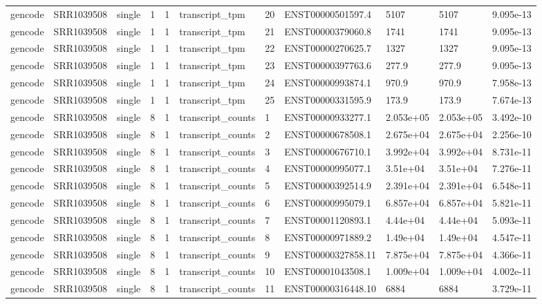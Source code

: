 \begin{tabular}{lllllllllll}
gencode & SRR1039508 & single & 1 & 1 & transcript\_tpm & 20 & ENST00000501597.4 & 5107 & 5107 & 9.095e-13 \\
gencode & SRR1039508 & single & 1 & 1 & transcript\_tpm & 21 & ENST00000379060.8 & 1741 & 1741 & 9.095e-13 \\
gencode & SRR1039508 & single & 1 & 1 & transcript\_tpm & 22 & ENST00000270625.7 & 1327 & 1327 & 9.095e-13 \\
gencode & SRR1039508 & single & 1 & 1 & transcript\_tpm & 23 & ENST00000397763.6 & 277.9 & 277.9 & 9.095e-13 \\
gencode & SRR1039508 & single & 1 & 1 & transcript\_tpm & 24 & ENST00000993874.1 & 970.9 & 970.9 & 7.958e-13 \\
gencode & SRR1039508 & single & 1 & 1 & transcript\_tpm & 25 & ENST00000331595.9 & 173.9 & 173.9 & 7.674e-13 \\
gencode & SRR1039508 & single & 8 & 1 & transcript\_counts & 1 & ENST00000933277.1 & 2.053e+05 & 2.053e+05 & 3.492e-10 \\
gencode & SRR1039508 & single & 8 & 1 & transcript\_counts & 2 & ENST00000678508.1 & 2.675e+04 & 2.675e+04 & 2.256e-10 \\
gencode & SRR1039508 & single & 8 & 1 & transcript\_counts & 3 & ENST00000676710.1 & 3.992e+04 & 3.992e+04 & 8.731e-11 \\
gencode & SRR1039508 & single & 8 & 1 & transcript\_counts & 4 & ENST00000995077.1 & 3.51e+04 & 3.51e+04 & 7.276e-11 \\
gencode & SRR1039508 & single & 8 & 1 & transcript\_counts & 5 & ENST00000392514.9 & 2.391e+04 & 2.391e+04 & 6.548e-11 \\
gencode & SRR1039508 & single & 8 & 1 & transcript\_counts & 6 & ENST00000995079.1 & 6.857e+04 & 6.857e+04 & 5.821e-11 \\
gencode & SRR1039508 & single & 8 & 1 & transcript\_counts & 7 & ENST00001120893.1 & 4.44e+04 & 4.44e+04 & 5.093e-11 \\
gencode & SRR1039508 & single & 8 & 1 & transcript\_counts & 8 & ENST00000971889.2 & 1.49e+04 & 1.49e+04 & 4.547e-11 \\
gencode & SRR1039508 & single & 8 & 1 & transcript\_counts & 9 & ENST00000327858.11 & 7.875e+04 & 7.875e+04 & 4.366e-11 \\
gencode & SRR1039508 & single & 8 & 1 & transcript\_counts & 10 & ENST00001043508.1 & 1.009e+04 & 1.009e+04 & 4.002e-11 \\
gencode & SRR1039508 & single & 8 & 1 & transcript\_counts & 11 & ENST00000316448.10 & 6884 & 6884 & 3.729e-11 \\

\end{tabular}
